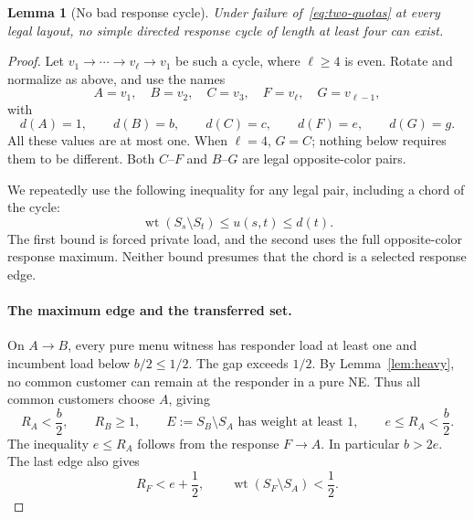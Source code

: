 \documentclass[11pt]{article}
\newtheorem{lemma}[theorem]{Lemma}
\theoremstyle{definition}
\theoremstyle{remark}
\newcommand{\wt}{\operatorname{wt}}
\begin{document}
\begin{lemma}[No bad response cycle]\label{lem:allcycles}
Under failure of~\eqref{eq:two-quotas} at every legal layout, no simple directed response cycle of length at least four can exist.
\end{lemma}
\begin{proof}
Let $v_1\to\cdots\to v_\ell\to v_1$ be such a cycle, where $\ell\ge4$ is even. Rotate and normalize as above, and use the names
\[
 A=v_1,\quad B=v_2,\quad C=v_3,\quad F=v_\ell,\quad G=v_{\ell-1},
\]
with
\[
 d(A)=1,\qquad d(B)=b,\qquad d(C)=c,\qquad d(F)=e,\qquad d(G)=g.
\]
All these values are at most one. When $\ell=4$, $G=C$; nothing below requires them to be different. Both $C$--$F$ and $B$--$G$ are legal opposite-color pairs.

We repeatedly use the following inequality for any legal pair, including a chord of the cycle:
\begin{equation}\label{eq:private-chord}
 \wt(S_s\setminus S_t)\le u(s,t)\le d(t).
\end{equation}
The first bound is forced private load, and the second uses the full opposite-color response maximum. Neither bound presumes that the chord is a selected response edge.

\paragraph{The maximum edge and the transferred set.}
On $A\to B$, every pure menu witness has responder load at least one and incumbent load below $b/2\le1/2$. The gap exceeds $1/2$. By Lemma~\ref{lem:heavy}, no common customer can remain at the responder in a pure NE. Thus all common customers choose $A$, giving
\begin{equation}\label{eq:max-edge}
 R_A<\frac b2,\qquad R_B\ge1,\qquad
 E:=S_B\setminus S_A\text{ has weight at least }1,
 \qquad e\le R_A<\frac b2.
\end{equation}
The inequality $e\le R_A$ follows from the response $F\to A$. In particular $b>2e$. The last edge also gives
\begin{equation}\label{eq:last-edge}
 R_F<e+\frac12,\qquad \wt(S_F\setminus S_A)<\frac12.
\end{equation}


\end{proof}
\end{document}
